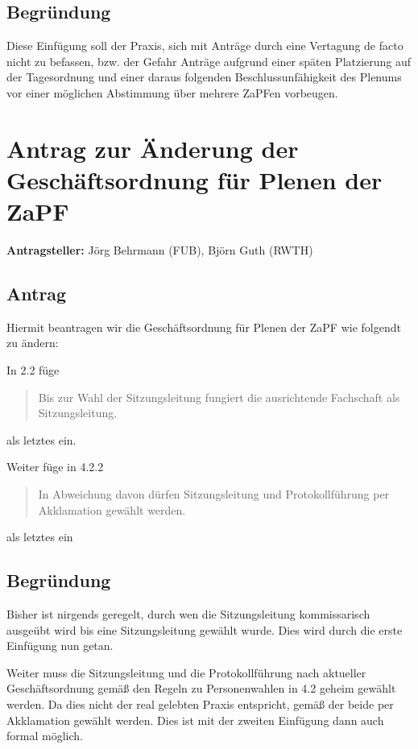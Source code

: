 \documentclass[draft,10pt,oneside]{scrartcl}
\begin{document}
\subsection*{Begründung}
Diese Einfügung soll der Praxis, sich mit Anträge durch eine Vertagung de facto
nicht zu befassen, bzw. der Gefahr Anträge aufgrund einer späten Platzierung auf
der Tagesordnung und einer daraus folgenden Beschlussunfähigkeit des Plenums vor
einer möglichen Abstimmung über mehrere ZaPFen vorbeugen.

\newpage

\section*{Antrag zur Änderung der Geschäftsordnung für Plenen der ZaPF}

\textbf{Antragsteller:} Jörg Behrmann (FUB), Björn Guth (RWTH)

\subsection*{Antrag}

Hiermit beantragen wir die Geschäftsordnung für Plenen der ZaPF wie folgendt zu ändern:

In 2.2 füge
\begin{quote}
	Bis zur Wahl der Sitzungsleitung fungiert die ausrichtende Fachschaft als
	Sitzungsleitung.
\end{quote}
als letztes ein.
\vspace{0.25cm}

Weiter füge in 4.2.2
\begin{quote}
	In Abweichung davon dürfen Sitzungsleitung und Protokollführung per
	Akklamation gewählt werden.
\end{quote}
als letztes ein

\subsection*{Begründung}
Bisher ist nirgends geregelt, durch wen die Sitzungsleitung kommissarisch
ausgeübt wird bis eine Sitzungsleitung gewählt wurde. Dies wird durch die erste
Einfügung nun getan.

Weiter muss die Sitzungsleitung und die Protokollführung nach aktueller
Geschäftsordnung gemäß den Regeln zu Personenwahlen in 4.2 geheim gewählt
werden. Da dies nicht der real gelebten Praxis entspricht, gemäß der beide per
Akklamation gewählt werden. Dies ist mit der zweiten Einfügung dann auch formal
möglich.
\end{document}
